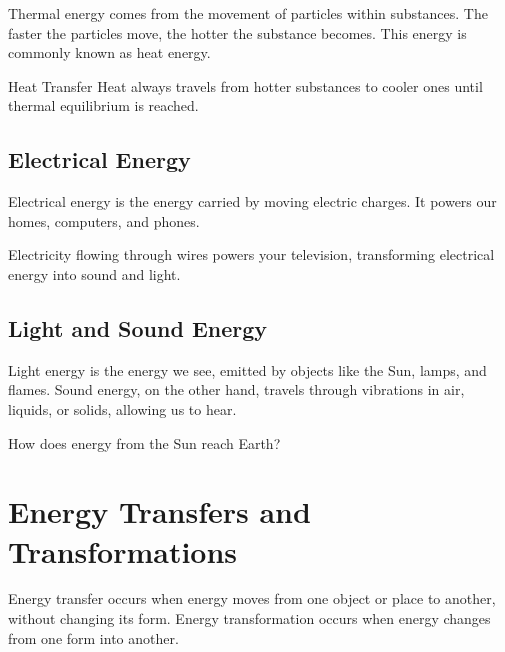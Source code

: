 Thermal energy comes from the movement of particles within substances. The faster the particles move, the hotter the substance becomes. This energy is commonly known as heat energy.


\begin{keyconcept}{Heat Transfer}
Heat always travels from hotter substances to cooler ones until thermal equilibrium is reached.
\end{keyconcept}

\subsection{Electrical Energy}

Electrical energy is the energy carried by moving electric charges. It powers our homes, computers, and phones.


\begin{example}
Electricity flowing through wires powers your television, transforming electrical energy into sound and light.
\end{example}

\subsection{Light and Sound Energy}

Light energy is the energy we see, emitted by objects like the Sun, lamps, and flames. Sound energy, on the other hand, travels through vibrations in air, liquids, or solids, allowing us to hear.

\begin{stopandthink}
How does energy from the Sun reach Earth?
\end{stopandthink}

\section{Energy Transfers and Transformations}

Energy transfer occurs when energy moves from one object or place to another, without changing its form. Energy transformation occurs when energy changes from one form into another.

